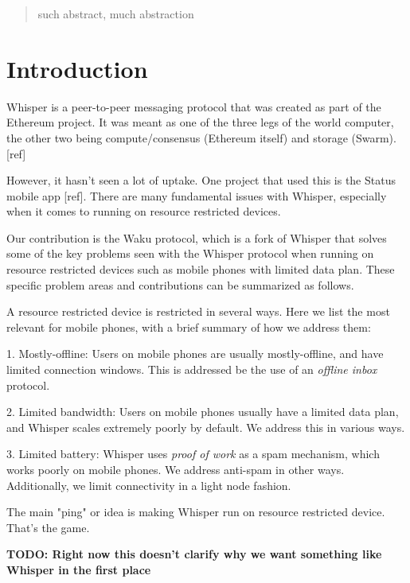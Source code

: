 \documentclass[12pt]{article}
\begin{document}
\maketitle
\begin{abstract}
  such abstract, much abstraction
\end{abstract}

\section{Introduction}

Whisper is a peer-to-peer messaging protocol that was created as part of the Ethereum project. It was meant as one of the three legs of the world computer, the other two being compute/consensus (Ethereum itself) and storage (Swarm). [ref]

However, it hasn't seen a lot of uptake. One project that used this is the Status mobile app [ref]. There are many fundamental issues with Whisper, especially when it comes to running on resource restricted devices.

Our contribution is the Waku protocol, which is a fork of Whisper that solves some of the key problems seen with the Whisper protocol when running on resource restricted devices such as mobile phones with limited data plan. These specific problem areas and contributions can be summarized as follows.

A resource restricted device is restricted in several ways. Here we list the most relevant for mobile phones, with a brief summary of how we address them:

1. Mostly-offline: Users on mobile phones are usually mostly-offline, and have limited connection windows. This is addressed be the use of an \textit{offline inbox} protocol.

2. Limited bandwidth: Users on mobile phones usually have a limited data plan, and Whisper scales extremely poorly by default. We address this in various ways.

3. Limited battery: Whisper uses \textit{proof of work} as a spam mechanism, which works poorly on mobile phones. We address anti-spam in other ways. Additionally, we limit connectivity in a light node fashion.

The main "ping" or idea is making Whisper run on resource restricted device. That's the game.

\textbf{TODO: Right now this doesn't clarify why we want something like Whisper in the first place}
\end{document}
